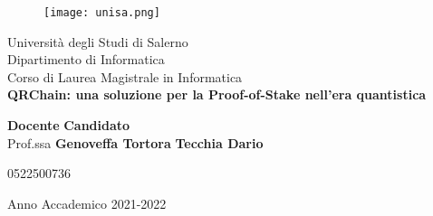 \begin{titlepage}
  \begin{center}
    \begin{figure}
        \texttt{[image: unisa.png]}
        \centering
      \end{figure}
    {\Large Università degli Studi di Salerno}\\[0.2truecm]
    {\large Dipartimento di Informatica}\\
    \hrulefill
    \vfill
    {\large Corso di Laurea Magistrale in Informatica}\\[0.2truecm]
    \vfill\vfill
    {\LARGE
      {\bf 
        QRChain: una soluzione per la Proof-of-Stake nell'era quantistica
      }
    }
    
    \vfill\vfill
    
    
    {\bf Docente} \hfill {\bf Candidato} \\
    Prof.ssa \textbf{Genoveffa Tortora} \hfill  \textbf{Tecchia Dario}
    \centerline{\hfill 0522500736}
    
    
    \vfill
    \hrulefill 
    \begin{center} Anno Accademico 2021-2022 \end{center}
    
  \end{center}
\end{titlepage}
  
\setcounter{page}{1} 		
